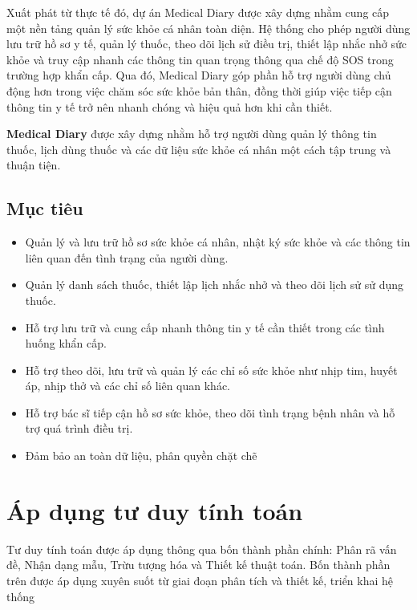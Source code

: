 \documentclass[12pt,a4paper]{report}
\begin{document}
Xuất phát từ thực tế đó, dự án Medical Diary được xây dựng nhằm cung cấp một nền tảng quản lý sức khỏe cá nhân toàn diện. Hệ thống cho phép người dùng lưu trữ hồ sơ y tế, quản lý thuốc, theo dõi lịch sử điều trị, thiết lập nhắc nhở sức khỏe và truy cập nhanh các thông tin quan trọng thông qua chế độ SOS trong trường hợp khẩn cấp. Qua đó, Medical Diary góp phần hỗ trợ người dùng chủ động hơn trong việc chăm sóc sức khỏe bản thân, đồng thời giúp việc tiếp cận thông tin y tế trở nên nhanh chóng và hiệu quả hơn khi cần thiết.

\textbf{Medical Diary} được xây dựng nhằm hỗ trợ người dùng quản lý thông tin thuốc, lịch dùng thuốc và các dữ liệu sức khỏe cá nhân một cách tập trung và thuận tiện.

\section{Mục tiêu}

\begin{itemize}[leftmargin=1.5em, itemsep=2pt]
    \item Quản lý và lưu trữ hồ sơ sức khỏe cá nhân, nhật ký sức khỏe và các thông tin liên quan đến tình trạng của người dùng.
    \item Quản lý danh sách thuốc, thiết lập lịch nhắc nhở và theo dõi lịch sử sử dụng thuốc.
    \item Hỗ trợ lưu trữ và cung cấp nhanh thông tin y tế cần thiết trong các tình huống khẩn cấp.
    \item Hỗ trợ theo dõi, lưu trữ và quản lý các chỉ số sức khỏe như nhịp tim, huyết áp, nhịp thở và các chỉ số liên quan khác.
    \item Hỗ trợ bác sĩ tiếp cận hồ sơ sức khỏe, theo dõi tình trạng bệnh nhân và hỗ trợ quá trình điều trị.
    \item Đảm bảo an toàn dữ liệu, phân quyền chặt chẽ
\end{itemize}

\chapter{Áp dụng tư duy tính toán}

Tư duy tính toán được áp dụng thông qua bốn thành phần chính: Phân rã vấn đề, Nhận dạng mẫu, Trừu tượng hóa và Thiết kế thuật toán. Bốn thành phần trên được áp dụng xuyên suốt từ giai đoạn phân tích và thiết kế, triển khai hệ thống
\end{document}

